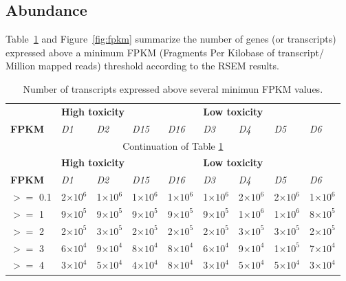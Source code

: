 \subsection{Abundance}

Table~\ref{tab:fpkm} and Figure~\ref{fig:fpkm} summarize the number of genes (or transcripts) expressed above a minimum FPKM (Fragments Per Kilobase of transcript/ Million mapped reads) threshold according to the RSEM results.

\clearpage

\begin{small}\begin{longtable}[c]{lllllllll}
    \caption{Number of transcripts expressed above several minimun FPKM values.\label{tab:fpkm}}\\
    \hline\hline
    & \multicolumn{4}{l}{\textbf{High toxicity}} & \multicolumn{4}{l}{\textbf{Low toxicity}}  \\
    \textbf{FPKM} & \textit{D1} & \textit{D2} & \textit{D15} & \textit{D16} & \textit{D3} & \textit{D4} & \textit{D5} & \textit{D6} \\
    \hline
    \endfirsthead
    \multicolumn{9}{c}{Continuation of Table \ref{tab:fpkm}}\\
    \hline
    & \multicolumn{4}{l}{\textbf{High toxicity}} & \multicolumn{4}{l}{\textbf{Low toxicity}}  \\
    \textbf{FPKM} & \textit{D1} & \textit{D2} & \textit{D15} & \textit{D16} & \textit{D3} & \textit{D4} & \textit{D5} & \textit{D6} \\
    \hline
    \endhead
    \hline\endfoot
    \hline\endlastfoot
    $>=$ 0.1 & 2$\times10^{6}$ & 1$\times10^{6}$ & 1$\times10^{6}$ & 1$\times10^{6}$ & 1$\times10^{6}$ & 2$\times10^{6}$ & 2$\times10^{6}$ & 1$\times10^{6}$ \\
    $>=$ 1 & 9$\times10^{5}$ & 9$\times10^{5}$ & 9$\times10^{5}$ & 9$\times10^{5}$ & 9$\times10^{5}$ & 1$\times10^{6}$ & 1$\times10^{6}$ & 8$\times10^{5}$ \\
    $>=$ 2 & 2$\times10^{5}$ & 3$\times10^{5}$ & 2$\times10^{5}$ & 2$\times10^{5}$ & 2$\times10^{5}$ & 3$\times10^{5}$ & 3$\times10^{5}$ & 2$\times10^{5}$ \\
    $>=$ 3 & 6$\times10^{4}$ & 9$\times10^{4}$ & 8$\times10^{4}$ & 8$\times10^{4}$ & 6$\times10^{4}$ & 9$\times10^{4}$ & 1$\times10^{5}$ & 7$\times10^{4}$ \\
    $>=$ 4 & 3$\times10^{4}$ & 5$\times10^{4}$ & 4$\times10^{4}$ & 8$\times10^{4}$ & 3$\times10^{4}$ & 5$\times10^{4}$ & 5$\times10^{4}$ & 3$\times10^{4}$ \\
\end{longtable}\end{small}

